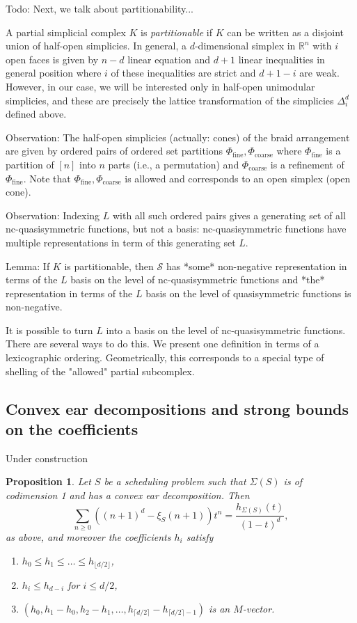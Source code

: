 \documentclass[12pt,reqno]{amsart}
\numberwithin{definition}{section}
\newtheorem{proposition}[definition]{Proposition}
\theoremstyle{definition}
\newcommand{\RR}{\mathbb{R}}
\newcommand{\SSS}{\mathcal{S}}
\newcommand{\floor}[1]{\lfloor {#1} \rfloor}
\newcommand{\ceil}[1]{\lceil {#1} \rceil}
\newcommand{\comment}[1]{\textsf{\footnotesize #1}}
\begin{document}
\comment{Todo: Next, we talk about partitionability...} 

A partial simplicial complex $K$ is \emph{partitionable} if $K$ can be written as a disjoint union of half-open simplicies. In general, a $d$-dimensional simplex in $\RR^n$ with $i$ open faces is given by $n-d$ linear equation and $d+1$ linear inequalities in general position where $i$ of these inequalities are strict and $d+1-i$ are weak. However, in our case, we will be interested only in half-open unimodular simplicies, and these are precisely the lattice transformation of the simplicies $\Delta^d_i$ defined above.

Observation: The half-open simplicies (actually: cones) of the braid arrangement are given by ordered pairs of ordered set partitions $\Phi_{\text{fine}},\Phi_{\text{coarse}}$ where $\Phi_{\text{fine}}$ is a partition of $[n]$ into $n$ parts (i.e., a permutation) and $\Phi_{\text{coarse}}$ is a refinement of $\Phi_{\text{fine}}$. Note that $\Phi_{\text{fine}},\Phi_{\text{coarse}}$ is allowed and corresponds to an open simplex (open cone).

Observation: Indexing $L$ with all such ordered pairs gives a generating set of all nc-quasisymmetric functions, but not a basis: nc-quasisymmetric functions have multiple representations in term of this generating set $L$.

Lemma: If $K$ is partitionable, then $\SSS$ has *some* non-negative representation in terms of the $L$ basis on the level of nc-quasisymmetric functions and *the* representation in terms of the $L$ basis on the level of quasisymmetric functions is non-negative.

It is possible to turn $L$ into a basis on the level of nc-quasisymmetric functions. There are several ways to do this. We present one definition in terms of a lexicographic ordering. Geometrically, this corresponds to a special type of shelling of the "allowed" partial subcomplex.

\subsection{Convex ear decompositions and strong bounds on the coefficients}

\comment{Under construction}

\begin{proposition}
Let $S$ be a scheduling problem such that $\Sigma(S)$ is of codimension 1 and has a convex ear decomposition. Then 
\[
  \sum_{n \geq 0} ((n+1)^d - \xi_S(n+1)) t^n = \frac{h_{\Sigma(S)}(t)}{(1-t)^d},
\]
as above, and moreover the coefficients $h_i$ satisfy
\begin{enumerate}
\item $h_0 \leq h_1 \leq \ldots \leq h_{\floor{d/2}}$,
\item $h_i\leq h_{d-i}$ for $i\leq d/2$,
\item $(h_0,h_1-h_0,h_2-h_1,\ldots,h_{\ceil{d/2}}-h_{\ceil{d/2}-1})$ is an $M$-vector.
\end{enumerate}
\end{proposition}
\end{document}
